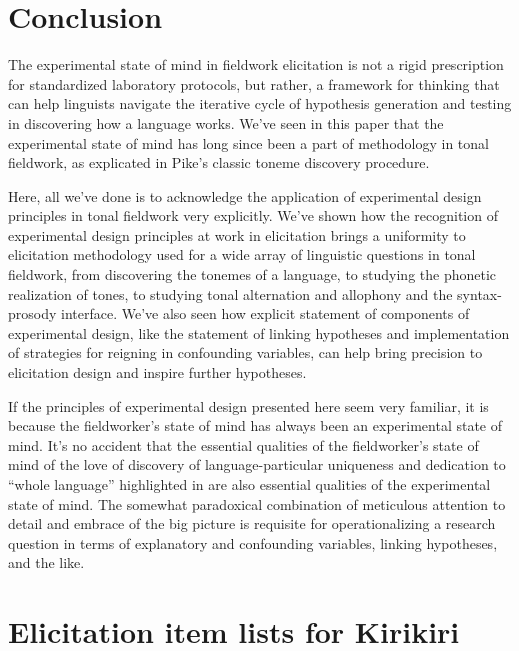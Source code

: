 \documentclass[12pt]{article}
\begin{document}
\section{Conclusion}
\label{sec:conclusion}

The experimental state of mind in fieldwork elicitation is not a rigid
prescription for standardized laboratory protocols, but rather, a
framework for thinking that can help linguists navigate the
iterative cycle of hypothesis generation and testing in discovering
how a language works. We've seen in this paper that the experimental
state of mind has long since been a part of methodology in tonal
fieldwork, as explicated in Pike's classic toneme discovery
procedure. 

Here, all we've done is to acknowledge the application of experimental
design principles in tonal fieldwork very explicitly. We've shown how
the recognition of experimental design principles at work in
elicitation brings a uniformity to elicitation methodology used for a
wide array of linguistic questions in tonal fieldwork, from
discovering the tonemes of a language, to studying
the phonetic realization of tones, to studying tonal alternation and
allophony and the syntax-prosody interface. We've also seen how
explicit statement of components of experimental design, like the
statement of linking hypotheses and implementation of strategies for reigning in
confounding variables, can help bring precision to elicitation design
and inspire further hypotheses.   

If the principles of experimental design presented here seem very
familiar, it is because the fieldworker's state of mind has always
been an experimental state of mind. It's no accident that the
essential qualities of the fieldworker's state of mind of the love of
discovery of language-particular uniqueness and dedication to ``whole
language'' highlighted in \citet[p.\
29-30]{Hyman:1985} are also essential qualities of the experimental
state of mind. The somewhat paradoxical combination of meticulous
attention to detail and embrace of the big picture is requisite for
operationalizing a research question in terms of explanatory and
confounding variables, linking hypotheses, and the like.  





\pagebreak

\appendix

\section{Elicitation item lists for Kirikiri}
\label{sec:kiy-tables}
\end{document}
